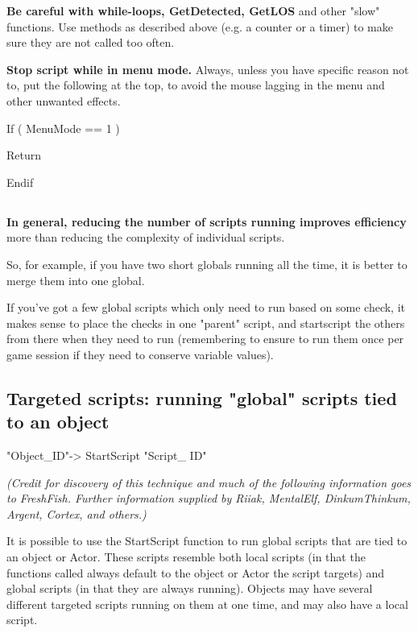 \textbf{Be careful with while-loops, GetDetected, GetLOS} and other
"slow" functions. Use methods as described above (e.g. a counter or a
timer) to make sure they are not called too often.

\textbf{Stop script while in menu mode.} Always, unless you have
specific reason not to, put the following at the top, to avoid the mouse
lagging in the menu and other unwanted effects.

If ( MenuMode == 1 )

Return

Endif

\hypertarget{section-12}{%
\subsection{}\label{section-12}}

\textbf{In general, reducing the number of scripts running improves
efficiency} more than reducing the complexity of individual scripts.

So, for example, if you have two short globals running all the time, it
is better to merge them into one global.

If you've got a few global scripts which only need to run based on some
check, it makes sense to place the checks in one "parent" script, and
startscript the others from there when they need to run (remembering to
ensure to run them once per game session if they need to conserve
variable values).

\hypertarget{targeted-scripts-running-global-scripts-tied-to-an-object}{%
\subsection{\texorpdfstring{\hfill\break
Targeted scripts: running "global" scripts tied to an
object}{ Targeted scripts: running "global" scripts tied to an object}}\label{targeted-scripts-running-global-scripts-tied-to-an-object}}

"Object\_ID"-> StartScript "Script\_ ID"

\emph{(Credit for discovery of this technique and much of the following
information goes to FreshFish. Further information supplied by Riiak,
MentalElf, DinkumThinkum, Argent, Cortex, and others.)}

It is possible to use the StartScript function to run global scripts
that are tied to an object or Actor. These scripts resemble both local
scripts (in that the functions called always default to the object or
Actor the script targets) and global scripts (in that they are always
running). Objects may have several different targeted scripts running on
them at one time, and may also have a local script.

